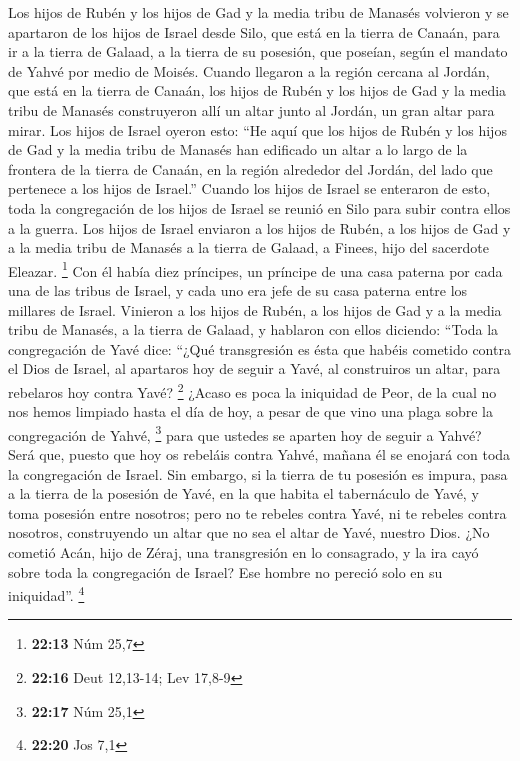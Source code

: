 \begin{paracol}{2}
 Los hijos de Rubén y los hijos de Gad y la media tribu de
Manasés volvieron y se apartaron de los hijos de Israel desde Silo, que
está en la tierra de Canaán, para ir a la tierra de Galaad, a la tierra
de su posesión, que poseían, según el mandato de Yahvé por medio de
Moisés.  Cuando llegaron a la región cercana al Jordán,
que está en la tierra de Canaán, los hijos de Rubén y los hijos de Gad y
la media tribu de Manasés construyeron allí un altar junto al Jordán, un
gran altar para mirar.  Los hijos de Israel oyeron esto:
``He aquí que los hijos de Rubén y los hijos de Gad y la media tribu de
Manasés han edificado un altar a lo largo de la frontera de la tierra de
Canaán, en la región alrededor del Jordán, del lado que pertenece a los
hijos de Israel.''  Cuando los hijos de Israel se
enteraron de esto, toda la congregación de los hijos de Israel se reunió
en Silo para subir contra ellos a la guerra.  Los hijos
de Israel enviaron a los hijos de Rubén, a los hijos de Gad y a la media
tribu de Manasés a la tierra de Galaad, a Finees, hijo del sacerdote
Eleazar. \footnote{\textbf{22:13} Núm 25,7}  Con él había
diez príncipes, un príncipe de una casa paterna por cada una de las
tribus de Israel, y cada uno era jefe de su casa paterna entre los
millares de Israel.  Vinieron a los hijos de Rubén, a los
hijos de Gad y a la media tribu de Manasés, a la tierra de Galaad, y
hablaron con ellos diciendo:  ``Toda la congregación de
Yavé dice: ``¿Qué transgresión es ésta que habéis cometido contra el
Dios de Israel, al apartaros hoy de seguir a Yavé, al construiros un
altar, para rebelaros hoy contra Yavé? \footnote{\textbf{22:16} Deut
  12,13-14; Lev 17,8-9}  ¿Acaso es poca la iniquidad de
Peor, de la cual no nos hemos limpiado hasta el día de hoy, a pesar de
que vino una plaga sobre la congregación de Yahvé, \footnote{\textbf{22:17}
  Núm 25,1}  para que ustedes se aparten hoy de seguir a
Yahvé? Será que, puesto que hoy os rebeláis contra Yahvé, mañana él se
enojará con toda la congregación de Israel.  Sin embargo,
si la tierra de tu posesión es impura, pasa a la tierra de la posesión
de Yavé, en la que habita el tabernáculo de Yavé, y toma posesión entre
nosotros; pero no te rebeles contra Yavé, ni te rebeles contra nosotros,
construyendo un altar que no sea el altar de Yavé, nuestro Dios.
 ¿No cometió Acán, hijo de Zéraj, una transgresión en lo
consagrado, y la ira cayó sobre toda la congregación de Israel? Ese
hombre no pereció solo en su iniquidad''. \footnote{\textbf{22:20} Jos
  7,1}


\end{paracol}
